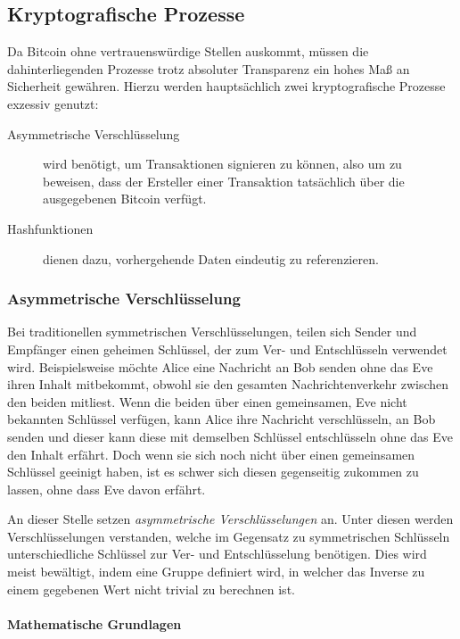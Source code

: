 \subsection{Kryptografische Prozesse}

Da Bitcoin ohne vertrauenswürdige Stellen auskommt, müssen die dahinterliegenden Prozesse trotz absoluter Transparenz ein hohes Maß an Sicherheit gewähren.
Hierzu werden hauptsächlich zwei kryptografische Prozesse exzessiv genutzt:
\begin{description}
    \item[Asymmetrische Verschlüsselung] wird benötigt, um Transaktionen signieren zu können, also um zu beweisen, dass der Ersteller einer Transaktion tatsächlich über die ausgegebenen Bitcoin verfügt.
    \item[Hashfunktionen] dienen dazu, vorhergehende Daten eindeutig zu referenzieren.
\end{description}

\subsubsection{Asymmetrische Verschlüsselung}

Bei traditionellen symmetrischen Verschlüsselungen, teilen sich Sender und Empfänger einen geheimen Schlüssel, der zum Ver- und Entschlüsseln verwendet wird.
Beispielsweise möchte Alice eine Nachricht an Bob senden ohne das Eve ihren Inhalt mitbekommt, obwohl sie den gesamten Nachrichtenverkehr zwischen den beiden mitliest.
Wenn die beiden über einen gemeinsamen, Eve nicht bekannten Schlüssel verfügen, kann Alice ihre Nachricht verschlüsseln, an Bob senden und dieser kann diese mit demselben Schlüssel entschlüsseln ohne das Eve den Inhalt erfährt.
Doch wenn sie sich noch nicht über einen gemeinsamen Schlüssel geeinigt haben, ist es schwer sich diesen gegenseitig zukommen zu lassen, ohne dass Eve davon erfährt.

An dieser Stelle setzen \emph{asymmetrische Verschlüsselungen} an.
Unter diesen werden Verschlüsselungen verstanden, welche im Gegensatz zu symmetrischen Schlüsseln unterschiedliche Schlüssel zur Ver- und Entschlüsselung benötigen.
Dies wird meist bewältigt, indem eine Gruppe definiert wird, in welcher das Inverse zu einem gegebenen Wert nicht trivial zu berechnen ist.

\paragraph{Mathematische Grundlagen}

